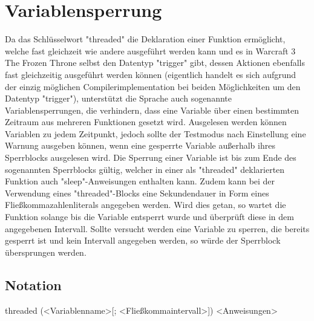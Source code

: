 \chapter{Variablensperrung}

Da das Schlüsselwort "threaded" die Deklaration einer Funktion ermöglicht, welche fast gleichzeit wie andere ausgeführt
werden kann und es in Warcraft 3 The Frozen Throne selbst den Datentyp "trigger" gibt, dessen Aktionen ebenfalls
fast gleichzeitig ausgeführt werden können (eigentlich handelt es sich aufgrund der einzig möglichen Compilerimplementation
bei beiden Möglichkeiten um den Datentyp "trigger"), unterstützt die Sprache auch sogenannte Variablensperrungen,
die verhindern, dass eine Variable über einen bestimmten Zeitraum aus mehreren Funktionen gesetzt wird.
Ausgelesen werden können Variablen zu jedem Zeitpunkt, jedoch sollte der Testmodus nach Einstellung eine Warnung
ausgeben können, wenn eine gesperrte Variable außerhalb ihres Sperrblocks ausgelesen wird.
Die Sperrung einer Variable ist bis zum Ende des sogenannten Sperrblocks gültig, welcher in einer als "threaded"
deklarierten Funktion auch "sleep"-Anweisungen enthalten kann.
Zudem kann bei der Verwendung eines "threaded"-Blocks eine Sekundendauer in Form eines Fließkommazahlenliterals
angegeben werden. Wird dies getan, so wartet die Funktion solange bis die Variable entsperrt wurde und überprüft
diese in dem angegebenen Intervall. Sollte versucht werden eine Variable zu sperren, die bereits gesperrt ist und
kein Intervall angegeben werden, so würde der Sperrblock übersprungen werden.

\section{Notation}
threaded (<Variablenname>[; <Fließkommaintervall>])
{
	<Anweisungen>
}
